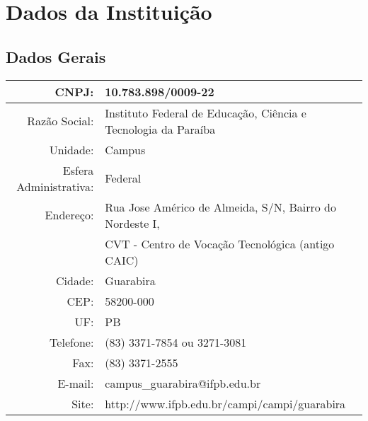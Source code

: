\section{Dados da Institui\c{c}\~ao}
\subsection{Dados Gerais}

\begin{table}[!htpb]
\centering

\begin{small} 
  
\setlength{\tabcolsep}{3pt} 
\begin{tabular}{|r|l|}\hline

CNPJ: & 10.783.898/0009-22\\ \hline
Razão Social: & Instituto Federal de Educação, Ciência e Tecnologia da Paraíba \\ \hline
Unidade: & Campus \\ \hline
Esfera Administrativa: & Federal \\ \hline
Endereço: & Rua Jose Américo de Almeida, S/N, Bairro do Nordeste I,\\&CVT - Centro de Vocação Tecnológica (antigo CAIC)\\ \hline
Cidade:	& Guarabira     \\ \hline
CEP: & 58200-000 \\ \hline  
UF: & PB \\ \hline
Telefone: & (83) 3371-7854 ou 3271-3081	\\ \hline
Fax: & (83) 3371-2555\\ \hline
E-mail: & campus\_guarabira@ifpb.edu.br	\\ \hline
Site: & http://www.ifpb.edu.br/campi/campi/guarabira\\ \hline
\end{tabular} 
\end{small}
\label{dadosinstituicao}
\end{table} 